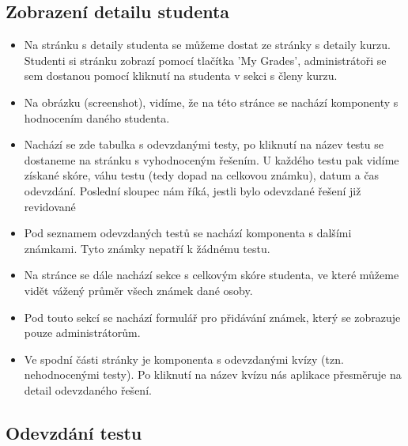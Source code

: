 \subsection{Zobrazení detailu studenta}

\begin{itemize}
	\item Na stránku s detaily studenta se můžeme dostat ze stránky s detaily kurzu. Studenti si stránku zobrazí pomocí tlačítka 'My Grades', administrátoři se sem dostanou pomocí kliknutí na studenta v sekci s členy kurzu.
	\item Na obrázku (screenshot), vidíme, že na této stránce se nachází komponenty s hodnocením daného studenta. 
	\item Nachází se zde tabulka s odevzdanými testy, po kliknutí na název testu se dostaneme na stránku s vyhodnoceným řešením. U každého testu pak vidíme získané skóre, váhu testu (tedy dopad na celkovou známku), datum a čas odevzdání. Poslední sloupec nám říká, jestli bylo odevzdané řešení již revidované
	\item Pod seznamem odevzdaných testů se nachází komponenta s dalšími známkami. Tyto známky nepatří k žádnému testu. 
	\item Na stránce se dále nachází sekce s celkovým skóre studenta, ve které můžeme vidět vážený průměr všech známek dané osoby.
	\item Pod touto sekcí se nachází formulář pro přidávání známek, který se zobrazuje pouze administrátorům.
	\item Ve spodní části stránky je komponenta s odevzdanými kvízy (tzn. nehodnocenými testy). Po kliknutí na název kvízu nás aplikace přesměruje na detail odevzdaného řešení.
\end{itemize}

\subsection{Odevzdání testu}

